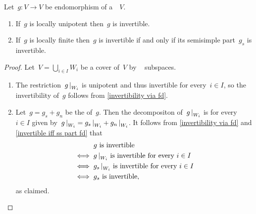 \begin{corollary}
  Let~$g \colon V \to V$ be endomorphism of a~~$V$.
  \begin{enumerate}
    \item
      If~$g$ is locally unipotent then~$g$ is invertible.
    \item
      If~$g$ is locally finite then~$g$ is invertible if and only if its semisimple part~$g_s$ is invertible.
  \end{enumerate}
\end{corollary}


\begin{proof}
  Let~$V = \bigcup_{i \in I} W_i$ be a cover of~$V$ by ~ subspaces.
  \begin{enumerate}
    \item
      The restriction~$\restrict{g}{W_i}$ is unipotent and thus invertible for every~$i \in I$, so the invertibility of~$g$ follows from \cref{invertibility via fd}.
    \item
      Let~$g = g_s + g_n$ be the {\JCD} of~$g$.
      Then the {\JCD} decompositon of~$\restrict{g}{W_i}$ is for every~$i \in I$ given by~$\restrict{g}{W_i} = \restrict{g_s}{W_i} + \restrict{g_n}{W_i}$.
      It follows from \cref{invertibility via fd} and \cref{invertible iff ss part fd} that
      \begin{align*}
              & \text{$g$ is invertible}  \\
        \iff{}& \text{$\restrict{g}{W_i}$ is invertible for every~$i \in I$}  \\
        \iff{}& \text{$\restrict{g_s}{W_i}$ is invertible for every~$i \in I$}  \\
        \iff{}& \text{$g_s$ is invertible},
      \end{align*}
      as claimed.
    \qedhere
  \end{enumerate}
\end{proof}



